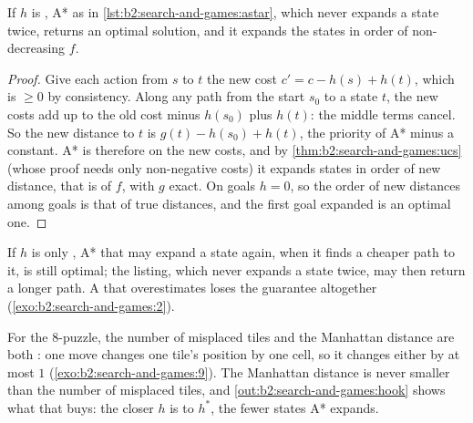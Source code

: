 \label{lst:b2:search-and-games:astar}

\begin{theorem}[Optimality of A*]\label{thm:b2:search-and-games:astar-optimal}
If $h$ is , A* as in \cref{lst:b2:search-and-games:astar}, which never expands a state twice, returns an optimal
solution, and it expands the states in order of non-decreasing $f$.
\end{theorem}

\begin{proof}
Give each action from $s$ to $t$ the new cost $c' = c - h(s) + h(t)$, which is $\geq 0$ by consistency. Along any path from
the start $s_0$ to a state $t$, the new costs add up to the old cost minus $h(s_0)$ plus $h(t)$: the middle terms cancel.
So the new distance to $t$ is $g(t) - h(s_0) + h(t)$, the priority of A* minus a constant. A* is therefore  on the new costs, and by \cref{thm:b2:search-and-games:ucs} (whose proof needs only non-negative costs) it
expands states in order of new distance, that is of $f$, with $g$ exact. On goals $h = 0$, so the order of new distances
among goals is that of true distances, and the first goal expanded is an optimal one.
\end{proof}

If $h$ is only , A* that may expand a state again, when it finds a cheaper path to it, is still optimal; the
listing, which never expands a state twice, may then return a longer path. A  that overestimates loses the
guarantee altogether (\cref{exo:b2:search-and-games:2}).

For the 8-puzzle, the number of misplaced tiles and the Manhattan distance are both : one move changes one
tile's position by one cell, so it changes either  by at most $1$ (\cref{exo:b2:search-and-games:9}). The
Manhattan distance is never smaller than the number of misplaced tiles, and \cref{out:b2:search-and-games:hook} shows
what that buys: the closer $h$ is to $h^*$, the fewer states A* expands.

